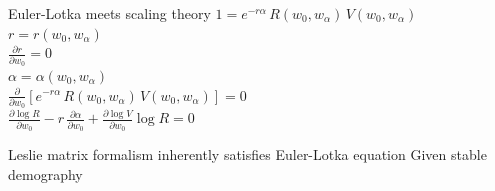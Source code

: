 \documentclass{beamer}
\begin{document}
{
  
}

\begin{frame}{Euler-Lotka meets scaling theory}
  $1 = e^{-r \alpha} \, R(w_0,w_{\alpha}) \, V(w_0,w_{\alpha})$\\
  \vspace{.5cm}
  \pause
  $r = r(w_0,w_{\alpha})$\\
  \vspace{.5cm}
  \pause
  $\frac{\partial r}{\partial w_0} = 0$\\
  \vspace{.5cm}
  \pause
  $\alpha = \alpha(w_0,w_{\alpha})$\\
  \vspace{.5cm}
  \pause
  $\frac{\partial}{\partial w_0} \left[ e^{-r \alpha} \, R(w_0,w_{\alpha}) \, V(w_0,w_{\alpha}) \right] = 0$\\
  \vspace{.5cm}
  \pause
  $\frac{\partial \log{R}}{\partial w_0} - r \, \frac{\partial \alpha}{\partial w_0} + \frac{\partial \log{V}}{\partial w_0} \log{R} = 0$\\
\end{frame}

{
  
}


\begin{frame}{Leslie matrix formalism inherently satisfies Euler-Lotka equation}
Given stable demography\\
\end{frame}
\end{document}
